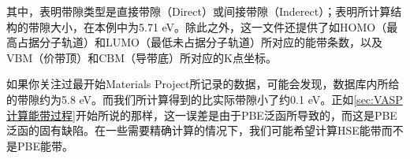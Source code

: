 其中，表明带隙类型是直接带隙（Direct）或间接带隙（Inderect）；表明所计算结构的带隙大小，在本例中为5.71 eV。除此之外，这一文件还提供了如HOMO（最高占据分子轨道）和LUMO（最低未占据分子轨道）所对应的能带条数，以及VBM（价带顶）和CBM（导带底）所对应的K点坐标。

\begin{attention}
    如果你关注过最开始Materials Project所记录的数据，可能会发现，数据库内所给的带隙约为5.8 eV。而我们所计算得到的比实际带隙小了约0.1 eV。正如\ref{sec:VASP计算能带过程}开始所说的那样，这一误差是由于PBE泛函所导致的，而这是PBE泛函的固有缺陷。在一些需要精确计算的情况下，我们可能希望计算HSE能带而不是PBE能带。
\end{attention}





